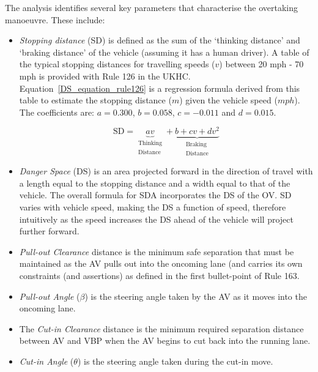 The analysis identifies several key parameters that characterise the overtaking manoeuvre. These include:
\begin{itemize}
    \item \emph{Stopping distance} (SD) is defined as the sum of the `thinking distance' and `braking distance' of the vehicle (assuming it has a human driver). %
    A table of the typical stopping distances for travelling speeds ($v$) between 20 mph - 70 mph is provided with Rule 126 in the UKHC.
    Equation~\ref{DS_equation_rule126} is a regression formula derived from this table to estimate the stopping distance ($m$) given the vehicle speed ($mph$). %
    The coefficients are: $a=0.300$, $b=0.058$, $c=-0.011$ and $d=0.015$.
    
\begin{equation} 
\label{DS_equation_rule126}
\text{SD} = \underbrace{av }_{\substack{\text{Thinking} \\ \text{Distance}}} + \underbrace{b + cv + dv^2}_{\substack{\text{Braking} \\ \text{Distance}}}
\end{equation}

    \item \emph{Danger Space} (DS) is an area projected forward in the direction of travel with a length equal to the stopping distance and a width equal to that of the vehicle. The overall formula for SDA incorporates the DS of the OV.
    SD varies with vehicle speed, making the DS a function of speed, therefore intuitively as the speed increases the DS ahead of the vehicle will project further forward.
    
    \item \emph{Pull-out Clearance} distance is the minimum safe separation that must be maintained as the AV pulls out into the oncoming lane (and carries its own constraints (and assertions) as defined in the first bullet-point of Rule 163.%
    
    \item \emph{Pull-out Angle} ($\beta$) is the steering angle taken by the AV as it moves into the oncoming lane.
    
    \item The \emph{Cut-in Clearance} distance is the minimum required separation distance between AV and VBP when the AV begins to cut back into the running lane.
    
    \item \emph{Cut-in Angle} ($\theta$) is the steering angle taken during the cut-in move.
\end{itemize}

